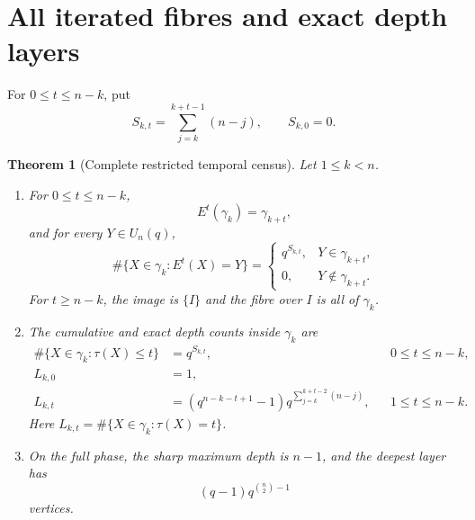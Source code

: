 \documentclass[10pt,a4paper]{amsart}
\newtheorem{theorem}{Theorem}[section]
\theoremstyle{definition}
\theoremstyle{remark}
\begin{document}
\section{All iterated fibres and exact depth layers}
\label{sec:temporal}

For $0\le t\le n-k$, put
\begin{equation}
 S_{k,t}=\sum_{j=k}^{k+t-1}(n-j),\qquad S_{k,0}=0.
 \label{eq:Skt}
\end{equation}

\begin{theorem}[Complete restricted temporal census]
\label{thm:iterates}
Let $1\le k<n$.
\begin{enumerate}[label=\textup{(\roman*)}]
\item For $0\le t\le n-k$,
\begin{equation}
                   E^t(\gamma_k)=\gamma_{k+t},
 \label{eq:iterated-image}
\end{equation}
and for every $Y\in U_n(q)$,
\begin{equation}
 \#\{X\in\gamma_k:E^t(X)=Y\}
 =\begin{cases}
   q^{S_{k,t}},&Y\in\gamma_{k+t},\\
   0,&Y\notin\gamma_{k+t}.
  \end{cases}
 \label{eq:iterated-fibre}
\end{equation}
For $t\ge n-k$, the image is $\{I\}$ and the fibre over $I$ is all of
$\gamma_k$.
\item The cumulative and exact depth counts inside $\gamma_k$ are
\begin{align}
 \#\{X\in\gamma_k:\tau(X)\le t\}&=q^{S_{k,t}},
       &&0\le t\le n-k,                       \label{eq:cdf}\\
 L_{k,0}&=1,                                   \label{eq:layer-zero}\\
 L_{k,t}&=
 \left(q^{n-k-t+1}-1\right)
 q^{\sum_{j=k}^{k+t-2}(n-j)},
       &&1\le t\le n-k.                       \label{eq:layers}
\end{align}
Here $L_{k,t}=\#\{X\in\gamma_k:\tau(X)=t\}$.
\item On the full phase, the sharp maximum depth is $n-1$, and the deepest
layer has
\begin{equation}
                   (q-1)q^{\binom n2-1}
 \label{eq:deepest}
\end{equation}
vertices.
\end{enumerate}
\end{theorem}
\end{document}
